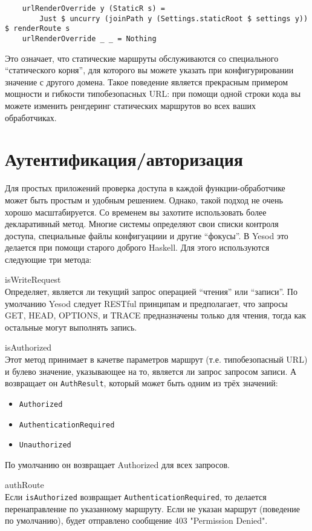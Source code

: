 \begin{lstlisting}
    urlRenderOverride y (StaticR s) =
        Just $ uncurry (joinPath y (Settings.staticRoot $ settings y)) $ renderRoute s
    urlRenderOverride _ _ = Nothing
\end{lstlisting}%

Это означает, что статические маршруты обслуживаются со специального ``статического корня'', для которого вы можете указать при конфигурировании значение с другого домена. Такое поведение является прекрасным примером мощности и гибкости типобезопасных URL: при помощи одной строки кода вы можете изменить ренгдеринг статических маршрутов во всех ваших обработчиках.

\section {Аутентификация/авторизация}

Для простых приложений проверка доступа в каждой функции-обработчике может быть простым и удобным решением. Однако, такой подход не очень хорошо масштабируется. Со временем вы захотите использовать более декларативный метод. Многие системы определяют свои списки контроля доступа, специальные файлы конфигуациии и другие ``фокусы''. В Yesod это делается при помощи старого доброго Haskell. Для этого используются следующие три метода:

\begin{description}
  \item {isWriteRequest} \hfill \\
    Определяет, является ли текущий запрос операцией ``чтения'' или ``записи''. По умолчанию Yesod следует RESTful принципам и предполагает, что запросы GET, HEAD, OPTIONS, и TRACE предназначены только для чтения, тогда как остальные могут выполнять запись.

  \item {isAuthorized} \hfill \\

    Этот метод принимает в качетве параметров маршрут (т.е. типобезопасный URL) и булево значение, указывающее на то, является ли запрос запросом записи. А возвращает он \lstinline!AuthResult!, который может быть одним из трёх значений:

    \begin{itemize}
      \item \lstinline!Authorized!
      \item \lstinline!AuthenticationRequired!
      \item \lstinline!Unauthorized!
    \end{itemize}

    По умолчанию он возвращает Authorized для всех запросов.

  \item {authRoute} \hfill \\

    Если \lstinline!isAuthorized! возвращает \lstinline!AuthenticationRequired!, то делается перенаправление по указанному маршруту. Если не указан маршрут (поведение по умолчанию), будет отправлено сообщение 403 "Permission Denied".

\end{description}

